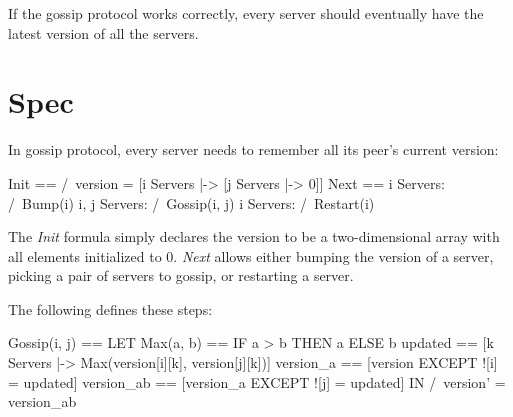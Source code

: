 If the gossip protocol works correctly, every server should eventually have
the latest version of all the servers.

\section{Spec}

In gossip protocol, every server needs to remember all its peer's current
version:\\

\begin{tla}
Init ==
    /\ version = [i \in Servers |-> [j \in Servers |-> 0]]
Next ==
    \/ \E i \in Servers:
        /\ Bump(i)
    \/ \E i, j \in Servers:
        /\ Gossip(i, j)
    \/ \E i \in Servers:
        /\ Restart(i)
\end{tla}
\begin{tlatex}
%
%
%
%
%
%
%
%
\end{tlatex}
\newline

The \textit{Init} formula simply declares the version to be a two-dimensional array
with all elements initialized to 0. \textit{Next} allows either bumping the version
of a server, picking a pair of servers to gossip, or restarting a server.\newline

The following defines these steps:\newline

\begin{tla}
Gossip(i, j) == 
    LET 
        Max(a, b) == IF a > b THEN a ELSE b
        updated == [k \in Servers |-> Max(version[i][k], version[j][k])]
        version_a == [version EXCEPT ![i] = updated]
        version_ab == [version_a EXCEPT ![j] = updated]
    IN 
        /\ version' = version_ab 
\end{tla}
\begin{tlatex}
%
%
%
%
\end{tlatex}
\newline

